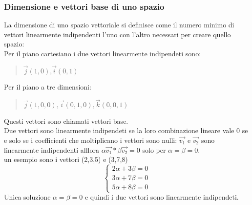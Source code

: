 \documentclass[a4paper]{article}
\begin{document}
\subsubsection{Dimensione e vettori base di uno spazio}
La dimensione di uno spazio vettoriale si definisce come il numero minimo di vettori linearmente indipendenti l'uno con l'altro necessari per creare quello spazio:
\\ Per il piano cartesiano i due vettori linearmente indipendeti sono: 
\begin{quote} \centering$\vec{j}(1,0)$,$\vec{i}(0,1) $
\end{quote}
Per il piano a tre dimensioni: 
\begin{quote} \centering $ \vec{j}(1,0,0), \vec{i}(0,1,0), \vec{k}(0,0,1) $
\end{quote}
Questi vettori sono chiamati vettori base.
\\Due vettori sono linearmente indipendeti se la loro combinazione lineare vale 0 se e solo se i coefficienti che moltiplicano i vettori sono nulli:
$\vec{v_{1}}$ e $\vec{v_{2}} $ sono linearmente indipendenti alllora $\alpha\vec{v_{1}}*\beta\vec{v_{2}}=0$ solo per $\alpha=\beta=0 $.
\\ un esempio sono i vettori (2,3,5) e (3,7,8) \\
\[\begin{cases}
2\alpha + 3\beta=0\\
3\alpha + 7\beta=0\\
5\alpha + 8\beta=0
\end{cases}
\]
Unica soluzione $\alpha=\beta=0$ e quindi i due vettori sono linearmente indipendeti.
\\
\end{document}
